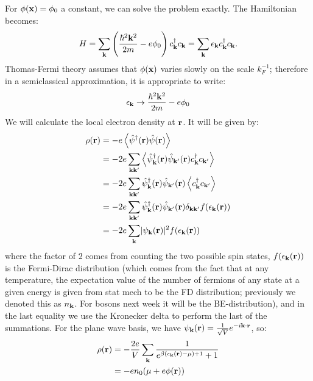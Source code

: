 For $\phi(\mathbf{x}) = \phi_0$ a constant, we can solve the problem exactly. The Hamiltonian becomes:
\begin{equation}
    H = \sum_{\mathbf{k}}\left(\frac{\hbar^2\mathbf{k}^2}{2m} - e\phi_0\right)c_{\mathbf{k}}^\dagger c_{\mathbf{k}} = \sum_{\mathbf{k}}\epsilon_{\mathbf{k}}c_{\mathbf{k}}^\dagger c_{\mathbf{k}}.
\end{equation}
Thomas-Fermi theory assumes that $\phi(\mathbf{x})$ varies slowly on the scale $k_F^{-1}$; therefore in a semiclassical approximation, it is appropriate to write:
\begin{equation}
    \epsilon_{\mathbf{k}} \to \frac{\hbar^2\mathbf{k}^2}{2m} - e\phi_0
\end{equation}
We will calculate the local electron density at $\mathbf{r}$. It will be given by:
\begin{equation}\label{eq-screeningchargedensity}
    \begin{split}
        \rho(\mathbf{r}) &= -e\left< \hat{\psi}^\dagger(\mathbf{r})\hat{\psi}(\mathbf{r}) \right>
        \\ &= -2e\sum_{\mathbf{k}\mathbf{k}'}\left< \hat{\psi}_{\mathbf{k}}^\dagger(\mathbf{r})\hat{\psi}_{\mathbf{k}'}(\mathbf{r})c^\dagger_{\mathbf{k}}c_{\mathbf{k}'} \right>
        \\ &= -2e\sum_{\mathbf{k}\mathbf{k}'}\hat{\psi}_{\mathbf{k}}^\dagger(\mathbf{r})\hat{\psi}_{\mathbf{k}'}(\mathbf{r})\left< c^\dagger_{\mathbf{k}}c_{\mathbf{k}'} \right>
        \\ &= -2e\sum_{\mathbf{k}\mathbf{k}'}\hat{\psi}_{\mathbf{k}}^\dagger(\mathbf{r})\hat{\psi}_{\mathbf{k}'}(\mathbf{r})\delta_{\mathbf{k}\mathbf{k}'}f(\epsilon_{\mathbf{k}}(\mathbf{r}))
        \\ &= -2e\sum_{\mathbf{k}}\lvert \psi_{\mathbf{k}}(\mathbf{r}) \rvert^2f(\epsilon_{\mathbf{k}}(\mathbf{r}))
    \end{split}
\end{equation}
where the factor of $2$ comes from counting the two possible spin states, $f(\epsilon_{\mathbf{k}}(\mathbf{r}))$ is the Fermi-Dirac distribution (which comes from the fact that at any temperature, the expectation value of the number of fermions of any state at a given energy is given from stat mech to be the FD distribution; previously we denoted this as $n_{\mathbf{k}}$. For bosons next week it will be the BE-distribution), and in the last equality we use the Kronecker delta to perform the last of the summations. For the plane wave basis, we have $\psi_{\mathbf{k}}(\mathbf{r}) = \frac{1}{\sqrt{V}}e^{-i\mathbf{k} \cdot \mathbf{r}}$, so:
\begin{equation}
    \begin{split}
        \rho(\mathbf{r}) &= -\frac{2e}{V}\sum_{\mathbf{k}}\frac{1}{e^{\beta(\epsilon_{\mathbf{k}}(\mathbf{r}) - \mu) + 1} + 1}
        \\ &= -en_0(\mu + e\phi(\mathbf{r}))
    \end{split}
\end{equation}
